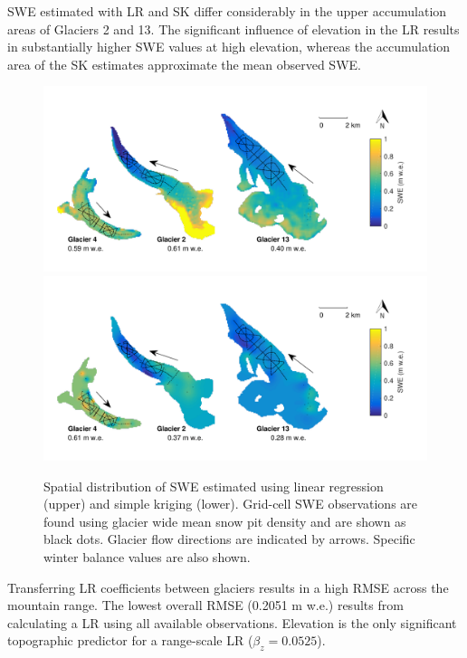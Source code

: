 \documentclass[review,oneside, letterpaper]{igs}
\begin{document}
SWE estimated with LR and SK differ considerably in the upper accumulation areas of Glaciers 2 and 13. The significant influence of elevation in the LR results in substantially higher SWE values at high elevation, whereas the accumulation area of the SK estimates approximate the mean observed SWE. 

\begin{figure}
	\centering
	\includegraphics[width =\textwidth]{LR_map.pdf}\\
		\vspace{-16 mm}
    \includegraphics[width =\textwidth]{SK_map.pdf}\\
	\caption{Spatial distribution of SWE estimated using linear regression (upper) and simple kriging (lower). Grid-cell SWE observations are found using glacier wide mean snow pit density and are shown as black dots. Glacier flow directions are indicated by arrows. Specific winter balance values are also shown.}
	\label{fig:LR_SK_map}
\end{figure}

Transferring LR coefficients between glaciers results in a high RMSE across the mountain range. The lowest overall RMSE (0.2051 m w.e.) results from calculating a LR using all available observations. Elevation is the only significant topographic predictor for a range-scale LR ($\beta_z=0.0525$).
\end{document}
